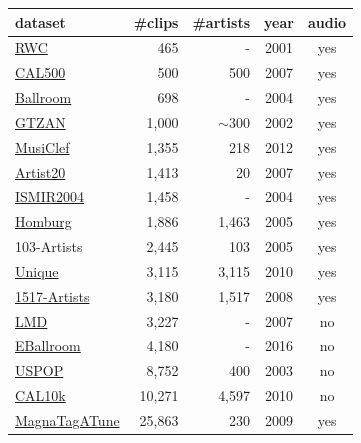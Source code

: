 \documentclass{article}
\begin{document}
\begin{table}[t]
	\small
	\centering
	\begin{threeparttable}
	\begin{tabular}{l@{ }rrcc}
		\toprule
		dataset\tnote{1} & \#clips & \#artists & year & audio \\
		\midrule
		\href{https://staff.aist.go.jp/m.goto/RWC-MDB/}{RWC} \cite{RWC} & 465 & - & 2001 & yes \\
		\href{http://calab1.ucsd.edu/~datasets/cal500/}{CAL500} \cite{cal500} & 500 & 500 & 2007 & yes \\
		\href{http://mtg.upf.edu/ismir2004/contest/tempoContest/node5.html}{Ballroom} \cite{ballroom} & 698 & - & 2004 & yes \\
		\href{https://marsyasweb.appspot.com/download/data_sets/}{GTZAN} \cite{gtzan} & 1,000 & $\sim300$ & 2002 & yes \\
		\href{http://www.cp.jku.at/datasets/musiclef/}{MusiClef} \cite{musiclef} & 1,355 & 218 & 2012 & yes \\
		\href{https://labrosa.ee.columbia.edu/projects/artistid/}{Artist20} \cite{artist20} & 1,413 & 20 & 2007 & yes \\
		\href{http://ismir2004.ismir.net/genre_contest/}{ISMIR2004} & 1,458 & - & 2004 & yes \\
		\href{http://www-ai.cs.uni-dortmund.de/audio.html}{Homburg} \cite{homburg} & 1,886 & 1,463 & 2005 & yes \\  %
		103-Artists \cite{103artists} & 2,445 & 103 & 2005 & yes \\
		\href{http://www.seyerlehner.info/index.php?p=1_3_Download}{Unique} \cite{unique} & 3,115 & 3,115 & 2010 & yes \\
		\href{http://www.seyerlehner.info/index.php?p=1_3_Download}{1517-Artists} \cite{1517artists} & 3,180 & 1,517 & 2008 & yes \\
		\href{http://www.ppgia.pucpr.br/~silla/lmd/}{LMD} \cite{lmd} & 3,227 & - & 2007 & no \\
		\href{http://anasynth.ircam.fr/home/media/ExtendedBallroom}{EBallroom} \cite{extballroom} & 4,180 & - & 2016 & no\tnote{2} \\
		\href{https://labrosa.ee.columbia.edu/projects/musicsim/uspop2002.html}{USPOP} \cite{uspop} & 8,752 & 400 & 2003 & no \\
		\href{http://calab1.ucsd.edu/~datasets/cal10k/}{CAL10k} \cite{cal10k} & 10,271 & 4,597 & 2010 & no \\ %
		\href{http://mirg.city.ac.uk/codeapps/the-magnatagatune-dataset}{MagnaTagATune} \cite{magnatagatune} & 25,863\tnote{3} & 230 & 2009 & yes\tnote{4} \\ %

\end{tabular}
\end{threeparttable}
\end{table}
\end{document}
